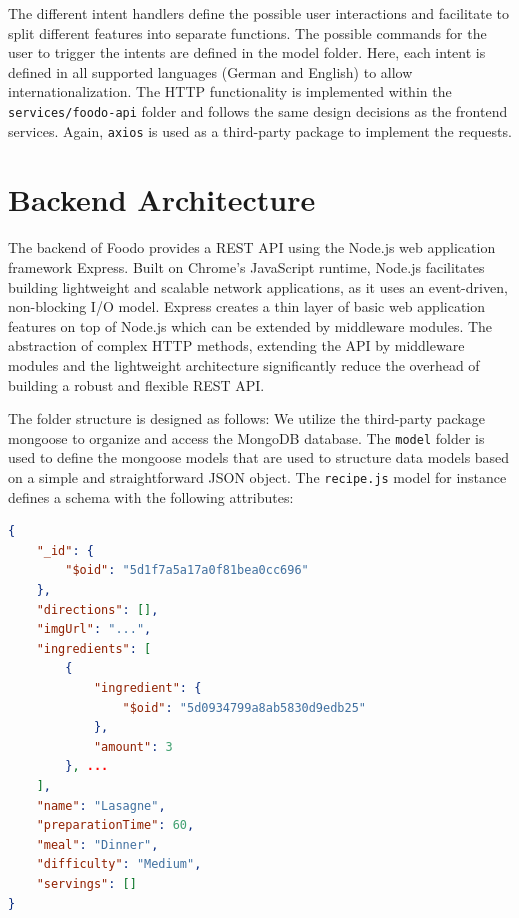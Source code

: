 The different intent handlers define the possible user interactions and facilitate to split different features into separate functions. The possible commands for the user to trigger the intents are defined in the model folder. Here, each intent is defined in all supported languages (German and English) to allow internationalization. The HTTP functionality is implemented within the \texttt{services/foodo-api} folder and follows the same design decisions as the frontend services. Again, \texttt{axios} is used as a third-party package to implement the requests. 

\section{Backend Architecture}

The backend of Foodo provides a REST API using the Node.js web application framework Express. Built on Chrome's JavaScript runtime, Node.js facilitates building lightweight and scalable network applications, as it uses an event-driven, non-blocking I/O model. Express creates a thin layer of basic web application features on top of Node.js which can be extended by middleware modules. The abstraction of complex HTTP methods, extending the API by middleware modules and the lightweight architecture significantly reduce the overhead of building a robust and flexible REST API.

\vspace{-1em}

The folder structure is designed as follows:
\vspace{1em}
We utilize the third-party package mongoose to organize and access the MongoDB database. The \texttt{model} folder is used to define the mongoose models that are used to structure data models based on a simple and straightforward JSON object. The \texttt{recipe.js} model for instance defines a schema with the following attributes:

\begin{scriptsize}
\begin{lstlisting}[language=json,firstnumber=1,caption={Example of recipe "Lasagne"},captionpos=b]
{
	"_id": {
		"$oid": "5d1f7a5a17a0f81bea0cc696"
	},
	"directions": [],
	"imgUrl": "...",
	"ingredients": [
		{
			"ingredient": {
				"$oid": "5d0934799a8ab5830d9edb25"
			},
			"amount": 3
		}, ...
	],
	"name": "Lasagne",
	"preparationTime": 60,
	"meal": "Dinner",
	"difficulty": "Medium",
	"servings": []
}
\end{lstlisting}
\end{scriptsize}

